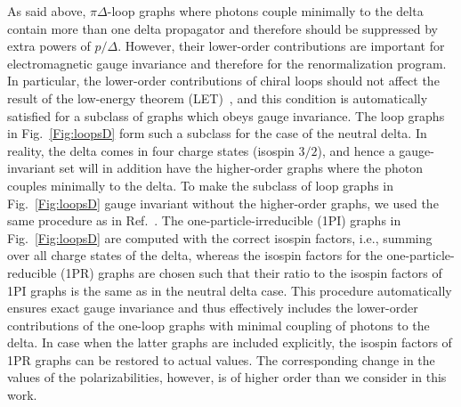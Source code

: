 \documentclass[twocolumn,prc,showpacs,nofootinbib,preprintnumbers,amsmath,amssymb,superscriptaddress]{revtex4-1}
\begin{document}
As said above, $\pi \Delta$-loop graphs where photons couple minimally to the delta contain more 
than one delta propagator and therefore should be suppressed by extra powers of $p/\varDelta$.
However, their lower-order contributions are important for electromagnetic gauge invariance and therefore for the 
renormalization program. In particular, the lower-order contributions of chiral loops should not affect the result of the low-energy
theorem (LET)~\cite{Low:1954kd}, and this condition is automatically satisfied for a subclass of graphs which obeys gauge invariance. The loop graphs in 
Fig.~\ref{Fig:loopsD} form such a subclass for the case of the neutral delta. In reality, the delta comes in four charge states (isospin $3/2$), and hence a 
gauge-invariant set will in addition have the higher-order graphs where the photon couples minimally to the delta. To make the subclass of loop graphs 
in Fig.~\ref{Fig:loopsD} gauge invariant without the higher-order graphs, we used the same procedure as in Ref.~\cite{Lensky:2009uv}. The one-particle-irreducible (1PI) graphs in Fig.~\ref{Fig:loopsD} are computed with the correct isospin factors, i.e., summing over all charge 
states of the delta, whereas the isospin factors for the one-particle-reducible (1PR) graphs are chosen such that their ratio to the isospin factors
of 1PI graphs is the same as in the neutral delta case. This procedure automatically ensures exact gauge invariance and thus 
effectively includes the lower-order contributions of the one-loop graphs with minimal coupling of photons to the delta. In case when the latter graphs 
are included explicitly, the isospin factors of 1PR graphs can be restored to actual values.
The corresponding change in the values of the polarizabilities, however, is of higher order than we consider in this work.
\end{document}
